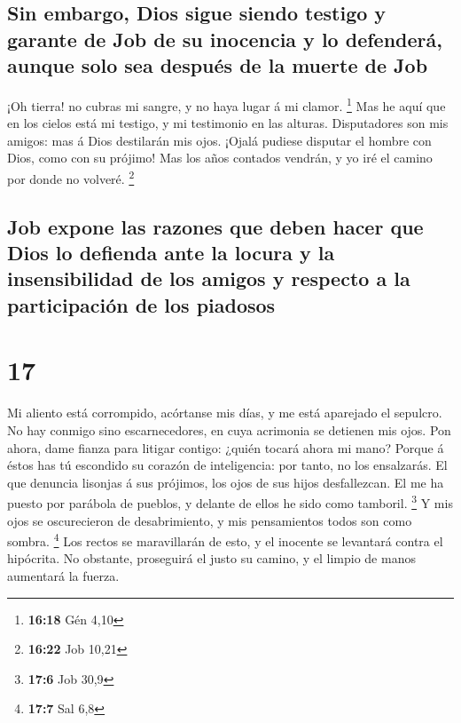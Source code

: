\hypertarget{sin-embargo-dios-sigue-siendo-testigo-y-garante-de-job-de-su-inocencia-y-lo-defenderuxe1-aunque-solo-sea-despuuxe9s-de-la-muerte-de-job}{%
\subsection{Sin embargo, Dios sigue siendo testigo y garante de Job de
su inocencia y lo defenderá, aunque solo sea después de la muerte de
Job}\label{sin-embargo-dios-sigue-siendo-testigo-y-garante-de-job-de-su-inocencia-y-lo-defenderuxe1-aunque-solo-sea-despuuxe9s-de-la-muerte-de-job}}

 ¡Oh tierra! no cubras mi sangre, y no haya lugar á mi
clamor. \footnote{\textbf{16:18} Gén 4,10}  Mas he aquí que
en los cielos está mi testigo, y mi testimonio en las alturas.
 Disputadores son mis amigos: mas á Dios destilarán mis
ojos.  ¡Ojalá pudiese disputar el hombre con Dios, como con
su prójimo!  Mas los años contados vendrán, y yo iré el
camino por donde no volveré. \footnote{\textbf{16:22} Job 10,21}

\hypertarget{job-expone-las-razones-que-deben-hacer-que-dios-lo-defienda-ante-la-locura-y-la-insensibilidad-de-los-amigos-y-respecto-a-la-participaciuxf3n-de-los-piadosos}{%
\subsection{Job expone las razones que deben hacer que Dios lo defienda
ante la locura y la insensibilidad de los amigos y respecto a la
participación de los
piadosos}\label{job-expone-las-razones-que-deben-hacer-que-dios-lo-defienda-ante-la-locura-y-la-insensibilidad-de-los-amigos-y-respecto-a-la-participaciuxf3n-de-los-piadosos}}

\hypertarget{section-16}{%
\section{17}\label{section-16}}

 Mi aliento está corrompido, acórtanse mis días, y me está
aparejado el sepulcro.  No hay conmigo sino escarnecedores,
en cuya acrimonia se detienen mis ojos.  Pon ahora, dame
fianza para litigar contigo: ¿quién tocará ahora mi mano? 
Porque á éstos has tú escondido su corazón de inteligencia: por tanto,
no los ensalzarás.  El que denuncia lisonjas á sus prójimos,
los ojos de sus hijos desfallezcan.  El me ha puesto por
parábola de pueblos, y delante de ellos he sido como tamboril.
\footnote{\textbf{17:6} Job 30,9}  Y mis ojos se
oscurecieron de desabrimiento, y mis pensamientos todos son como sombra.
\footnote{\textbf{17:7} Sal 6,8}  Los rectos se maravillarán
de esto, y el inocente se levantará contra el hipócrita.  No
obstante, proseguirá el justo su camino, y el limpio de manos aumentará
la fuerza.

